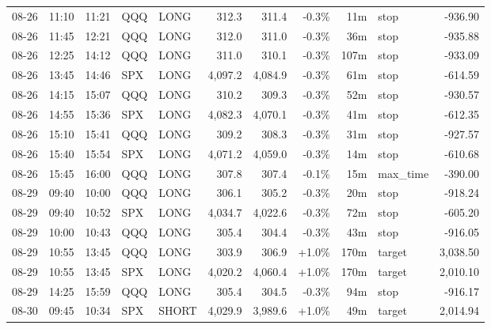 \documentclass[11pt,a4paper,twoside]{article}
\begin{document}
\begin{center}
\begin{longtable}{>{\color{txtmain}}l l l l l r r r r >{\color{txtmain}}l r}
08-26 & 11:10 & 11:21 & QQQ & LONG & 312.3 & 311.4 & \textcolor{lossred}{-0.3\%} & 11m & stop & \textcolor{lossred}{-936.90} \\
08-26 & 11:45 & 12:21 & QQQ & LONG & 312.0 & 311.0 & \textcolor{lossred}{-0.3\%} & 36m & stop & \textcolor{lossred}{-935.88} \\
08-26 & 12:25 & 14:12 & QQQ & LONG & 311.0 & 310.1 & \textcolor{lossred}{-0.3\%} & 107m & stop & \textcolor{lossred}{-933.09} \\
08-26 & 13:45 & 14:46 & SPX & LONG & 4,097.2 & 4,084.9 & \textcolor{lossred}{-0.3\%} & 61m & stop & \textcolor{lossred}{-614.59} \\
08-26 & 14:15 & 15:07 & QQQ & LONG & 310.2 & 309.3 & \textcolor{lossred}{-0.3\%} & 52m & stop & \textcolor{lossred}{-930.57} \\
08-26 & 14:55 & 15:36 & SPX & LONG & 4,082.3 & 4,070.1 & \textcolor{lossred}{-0.3\%} & 41m & stop & \textcolor{lossred}{-612.35} \\
08-26 & 15:10 & 15:41 & QQQ & LONG & 309.2 & 308.3 & \textcolor{lossred}{-0.3\%} & 31m & stop & \textcolor{lossred}{-927.57} \\
08-26 & 15:40 & 15:54 & SPX & LONG & 4,071.2 & 4,059.0 & \textcolor{lossred}{-0.3\%} & 14m & stop & \textcolor{lossred}{-610.68} \\
08-26 & 15:45 & 16:00 & QQQ & LONG & 307.8 & 307.4 & \textcolor{lossred}{-0.1\%} & 15m & max\_time & \textcolor{lossred}{-390.00} \\
08-29 & 09:40 & 10:00 & QQQ & LONG & 306.1 & 305.2 & \textcolor{lossred}{-0.3\%} & 20m & stop & \textcolor{lossred}{-918.24} \\
08-29 & 09:40 & 10:52 & SPX & LONG & 4,034.7 & 4,022.6 & \textcolor{lossred}{-0.3\%} & 72m & stop & \textcolor{lossred}{-605.20} \\
08-29 & 10:00 & 10:43 & QQQ & LONG & 305.4 & 304.4 & \textcolor{lossred}{-0.3\%} & 43m & stop & \textcolor{lossred}{-916.05} \\
08-29 & 10:55 & 13:45 & QQQ & LONG & 303.9 & 306.9 & \textcolor{wingreen}{+1.0\%} & 170m & target & \textcolor{wingreen}{3,038.50} \\
08-29 & 10:55 & 13:45 & SPX & LONG & 4,020.2 & 4,060.4 & \textcolor{wingreen}{+1.0\%} & 170m & target & \textcolor{wingreen}{2,010.10} \\
08-29 & 14:25 & 15:59 & QQQ & LONG & 305.4 & 304.5 & \textcolor{lossred}{-0.3\%} & 94m & stop & \textcolor{lossred}{-916.17} \\
08-30 & 09:45 & 10:34 & SPX & SHORT & 4,029.9 & 3,989.6 & \textcolor{wingreen}{+1.0\%} & 49m & target & \textcolor{wingreen}{2,014.94} \\

\end{longtable}
\end{center}
\end{document}
